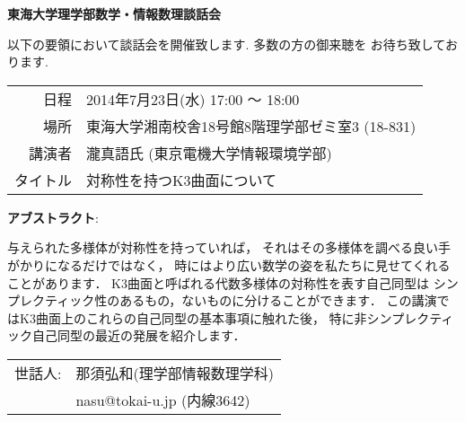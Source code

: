 \documentclass[12pt]{jarticle}
\title{}
\author{}
\date{}
\theoremstyle{definition}
\begin{document}

\begin{center}
 {\bf \Huge 東海大学理学部数学・情報数理談話会}
\end{center}

{\Large
以下の要領において談話会を開催致します. 多数の方の御来聴を
お待ち致しております. 

\smallskip

\begin{center}
  \begin{tabular}{rl}
    日程 & 2014年7月23日(水) 17:00 〜 18:00 \\
    場所 & 東海大学湘南校舎18号館8階理学部ゼミ室3 (18-831)\\
    講演者 & 瀧真語氏 (東京電機大学情報環境学部)\\
    タイトル & 対称性を持つK3曲面について
  \end{tabular}
\end{center}

\noindent
{\bf アブストラクト}:

与えられた多様体が対称性を持っていれば，
それはその多様体を調べる良い手がかりになるだけではなく，
時にはより広い数学の姿を私たちに見せてくれることがあります．
K3曲面と呼ばれる代数多様体の対称性を表す自己同型は
シンプレクティック性のあるもの，ないものに分けることができます．
この講演ではK3曲面上のこれらの自己同型の基本事項に触れた後，
特に非シンプレクティック自己同型の最近の発展を紹介します．


\vskip 2cm

\begin{flushright}
  \begin{tabular}{rl}
      世話人: & 那須弘和(理学部情報数理学科)\\
      & nasu@tokai-u.jp (内線3642)
  \end{tabular}

\end{flushright}
}
\end{document}
